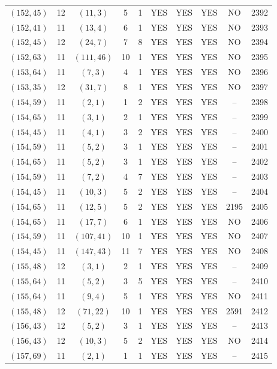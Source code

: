 \begin{longtable}{|c|c|c|c|c|c|c|c|c|c|}
$(152, 45)$ & 12 & $(11, 3)$ & 5 & 1 & YES & YES & YES & NO & 2392\\
$(152, 41)$ & 11 & $(13, 4)$ & 6 & 1 & YES & YES & YES & NO & 2393\\
$(152, 45)$ & 12 & $(24, 7)$ & 7 & 8 & YES & YES & YES & NO & 2394\\
$(152, 63)$ & 11 & $(111, 46)$ & 10 & 1 & YES & YES & YES & NO & 2395\\
$(153, 64)$ & 11 & $(7, 3)$ & 4 & 1 & YES & YES & YES & NO & 2396\\
$(153, 35)$ & 12 & $(31, 7)$ & 8 & 1 & YES & YES & YES & NO & 2397\\
$(154, 59)$ & 11 & $(2, 1)$ & 1 & 2 & YES & YES & YES & -- & 2398\\
$(154, 65)$ & 11 & $(3, 1)$ & 2 & 1 & YES & YES & YES & -- & 2399\\
$(154, 45)$ & 11 & $(4, 1)$ & 3 & 2 & YES & YES & YES & -- & 2400\\
$(154, 59)$ & 11 & $(5, 2)$ & 3 & 1 & YES & YES & YES & -- & 2401\\
$(154, 65)$ & 11 & $(5, 2)$ & 3 & 1 & YES & YES & YES & -- & 2402\\
$(154, 59)$ & 11 & $(7, 2)$ & 4 & 7 & YES & YES & YES & -- & 2403\\
$(154, 45)$ & 11 & $(10, 3)$ & 5 & 2 & YES & YES & YES & -- & 2404\\
$(154, 65)$ & 11 & $(12, 5)$ & 5 & 2 & YES & YES & YES & 2195 & 2405\\
$(154, 65)$ & 11 & $(17, 7)$ & 6 & 1 & YES & YES & YES & NO & 2406\\
$(154, 59)$ & 11 & $(107, 41)$ & 10 & 1 & YES & YES & YES & NO & 2407\\
$(154, 45)$ & 11 & $(147, 43)$ & 11 & 7 & YES & YES & YES & NO & 2408\\
$(155, 48)$ & 12 & $(3, 1)$ & 2 & 1 & YES & YES & YES & -- & 2409\\
$(155, 64)$ & 11 & $(5, 2)$ & 3 & 5 & YES & YES & YES & -- & 2410\\
$(155, 64)$ & 11 & $(9, 4)$ & 5 & 1 & YES & YES & YES & NO & 2411\\
$(155, 48)$ & 12 & $(71, 22)$ & 10 & 1 & YES & YES & YES & 2591 & 2412\\
$(156, 43)$ & 12 & $(5, 2)$ & 3 & 1 & YES & YES & YES & -- & 2413\\
$(156, 43)$ & 12 & $(10, 3)$ & 5 & 2 & YES & YES & YES & NO & 2414\\
$(157, 69)$ & 11 & $(2, 1)$ & 1 & 1 & YES & YES & YES & -- & 2415\\

\end{longtable}
